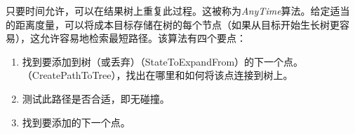 
只要时间允许，可以在结果树上重复此过程。这被称为\emph{AnyTime}算法。给定适当的距离度量，可以将成本目标存储在树的每个节点（如果从目标开始生长树更容易），这允许容易地检索最短路径。该算法有四个要点：

\begin{enumerate}

\item 找到要添加到树（或丢弃）（StateToExpandFrom）的下一个点。
（CreatePathToTree），找出在哪里和如何将该点连接到树上。
\item 测试此路径是否合适，即无碰撞。
\item 找到要添加的下一个点。
\end{enumerate}




